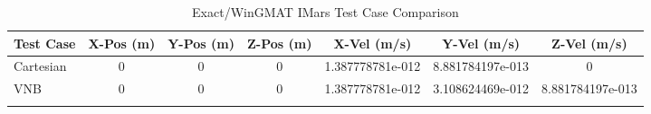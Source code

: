 \begin{table}[htbp!]
\centering
\caption{ Exact/WinGMAT IMars Test Case Comparison}
      \begin{tabular}{lcccccc}
      \hline\hline
          Test Case & X-Pos (m) & Y-Pos (m) & Z-Pos (m) & X-Vel (m/s) & Y-Vel (m/s) & Z-Vel (m/s) \\
         \hline
         Cartesian & 0 & 0 & 0 & 1.387778781e-012 & 8.881784197e-013 & 0 \\
         VNB & 0 & 0 & 0 & 1.387778781e-012 & 3.108624469e-012 & 8.881784197e-013 \\
      \hline\hline
      \label{Table: IMars Exact-WinGMAT Table} 
\end{tabular}
\end{table}
